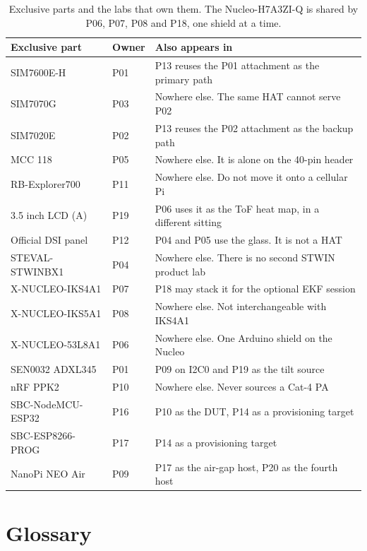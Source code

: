 \begin{table}[H]\centering\small
\begin{tabular}{p{40mm}p{16mm}p{90mm}}
\toprule
Exclusive part & Owner & Also appears in \\
\midrule
SIM7600E-H & P01 & P13 reuses the P01 attachment as the primary path \\
SIM7070G & P03 & Nowhere else. The same HAT cannot serve P02 \\
SIM7020E & P02 & P13 reuses the P02 attachment as the backup path \\
MCC 118 & P05 & Nowhere else. It is alone on the 40-pin header \\
RB-Explorer700 & P11 & Nowhere else. Do not move it onto a cellular Pi \\
3.5 inch LCD (A) & P19 & P06 uses it as the ToF heat map, in a different sitting \\
Official DSI panel & P12 & P04 and P05 use the glass. It is not a HAT \\
STEVAL-STWINBX1 & P04 & Nowhere else. There is no second STWIN product lab \\
X-NUCLEO-IKS4A1 & P07 & P18 may stack it for the optional EKF session \\
X-NUCLEO-IKS5A1 & P08 & Nowhere else. Not interchangeable with IKS4A1 \\
X-NUCLEO-53L8A1 & P06 & Nowhere else. One Arduino shield on the Nucleo \\
SEN0032 ADXL345 & P01 & P09 on I2C0 and P19 as the tilt source \\
nRF PPK2 & P10 & Nowhere else. Never sources a Cat-4 PA \\
SBC-NodeMCU-ESP32 & P16 & P10 as the DUT, P14 as a provisioning target \\
SBC-ESP8266-PROG & P17 & P14 as a provisioning target \\
NanoPi NEO Air & P09 & P17 as the air-gap host, P20 as the fourth host \\
\bottomrule
\end{tabular}
\caption{Exclusive parts and the labs that own them. The Nucleo-H7A3ZI-Q is shared by P06, P07, P08 and P18, one shield at a time.}
\end{table}

\section{Glossary}

